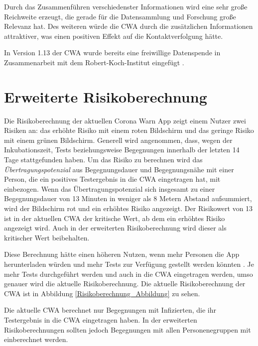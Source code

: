 \documentclass[conference,compsoc]{IEEEtran}
\begin{document}
Durch das Zusammenführen verschiedenster Informationen wird eine sehr große Reichweite erzeugt, die gerade für die Datensammlung und Forschung große Relevanz hat.
Des weiteren würde die CWA durch die zusätzlichen Informationen attraktiver, was einen positiven Effekt auf die Kontaktverfolgung hätte.

In Version 1.13 der CWA wurde bereits eine freiwillige Datenspende in Zusammenarbeit mit dem Robert-Koch-Institut eingefügt \cite{freiwilligeDatenspende}. 

\section{Erweiterte Risikoberechnung} \label{Erweiterte_Risikoberechnung}

Die Risikoberechnung der aktuellen Corona Warn App zeigt einem Nutzer zwei Risiken an: 
das erhöhte Risiko mit einem roten Bildschirm und das geringe Risiko mit einem grünen Bildschirm. 
Generell wird angenommen, dass, wegen der Inkubationszeit, Tests beziehungsweise Begegnungen innerhalb der letzten 14 Tage stattgefunden haben.
Um das Risiko zu berechnen wird das \textit{Übertragungspotenzial} aus Begegnungsdauer und Begegnungsnähe mit einer Person, 
die ein positives Testergebnis in die CWA eingetragen hat, mit einbezogen. 
Wenn das Übertragungspotenzial sich insgesamt zu einer Begegnungsdauer von 13 Minuten in weniger als 8 Metern Abstand aufsummiert, 
wird der Bildschirm rot und ein erhöhtes Risiko angezeigt.
Der Risikowert von 13 ist in der aktuellen CWA der kritische Wert, ab dem ein erhöhtes Risiko angezeigt wird.
Auch in der erweiterten Risikoberechnung wird dieser als kritischer Wert beibehalten.

Diese Berechnung hätte einen höheren Nutzen, wenn mehr Personen die App herunterladen würden und mehr Tests zur Verfügung gestellt werden könnten \cite{EffectivenessCWA}.
Je mehr Tests durchgeführt werden und auch in die CWA eingetragen werden, umso genauer wird die aktuelle Risikoberechnung. 
Die aktuelle Risikoberechnung der CWA ist in Abbildung \ref{Risikoberechnung_Abbildung} zu sehen.


Die aktuelle CWA berechnet nur Begegnungen mit Infizierten, die ihr Testergebnis in die CWA eingetragen haben.
In der erweiterten Risikoberechnungen sollten jedoch Begegnungen mit allen Personenegruppen mit einberechnet werden.
\end{document}
